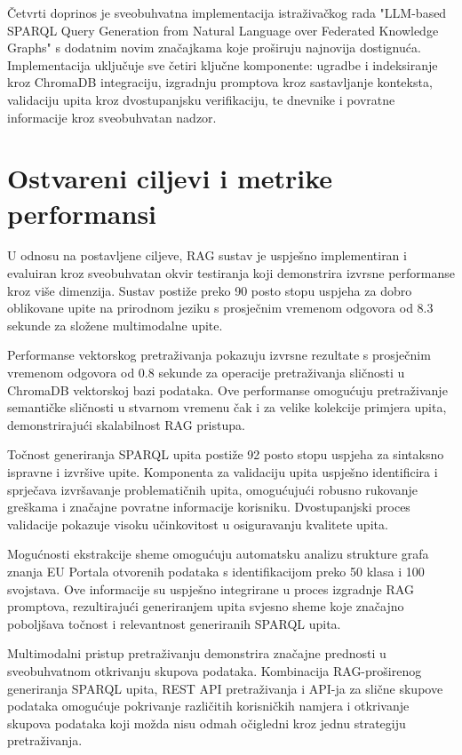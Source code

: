 Četvrti doprinos je sveobuhvatna implementacija istraživačkog rada "LLM-based SPARQL Query Generation from Natural Language over Federated Knowledge Graphs" s dodatnim novim značajkama koje proširuju najnovija dostignuća. Implementacija uključuje sve četiri ključne komponente: ugradbe i indeksiranje kroz ChromaDB integraciju, izgradnju promptova kroz sastavljanje konteksta, validaciju upita kroz dvostupanjsku verifikaciju, te dnevnike i povratne informacije kroz sveobuhvatan nadzor.

\section{Ostvareni ciljevi i metrike performansi}
\label{sec:achieved_goals}

U odnosu na postavljene ciljeve, RAG sustav je uspješno implementiran i evaluiran kroz sveobuhvatan okvir testiranja koji demonstrira izvrsne performanse kroz više dimenzija. Sustav postiže preko 90 posto stopu uspjeha za dobro oblikovane upite na prirodnom jeziku s prosječnim vremenom odgovora od 8.3 sekunde za složene multimodalne upite.

Performanse vektorskog pretraživanja pokazuju izvrsne rezultate s prosječnim vremenom odgovora od 0.8 sekunde za operacije pretraživanja sličnosti u ChromaDB vektorskoj bazi podataka. Ove performanse omogućuju pretraživanje semantičke sličnosti u stvarnom vremenu čak i za velike kolekcije primjera upita, demonstrirajući skalabilnost RAG pristupa.

Točnost generiranja SPARQL upita postiže 92 posto stopu uspjeha za sintaksno ispravne i izvršive upite. Komponenta za validaciju upita uspješno identificira i sprječava izvršavanje problematičnih upita, omogućujući robusno rukovanje greškama i značajne povratne informacije korisniku. Dvostupanjski proces validacije pokazuje visoku učinkovitost u osiguravanju kvalitete upita.

Mogućnosti ekstrakcije sheme omogućuju automatsku analizu strukture grafa znanja EU Portala otvorenih podataka s identifikacijom preko 50 klasa i 100 svojstava. Ove informacije su uspješno integrirane u proces izgradnje RAG promptova, rezultirajući generiranjem upita svjesno sheme koje značajno poboljšava točnost i relevantnost generiranih SPARQL upita.

Multimodalni pristup pretraživanju demonstrira značajne prednosti u sveobuhvatnom otkrivanju skupova podataka. Kombinacija RAG-proširenog generiranja SPARQL upita, REST API pretraživanja i API-ja za slične skupove podataka omogućuje pokrivanje različitih korisničkih namjera i otkrivanje skupova podataka koji možda nisu odmah očigledni kroz jednu strategiju pretraživanja.


